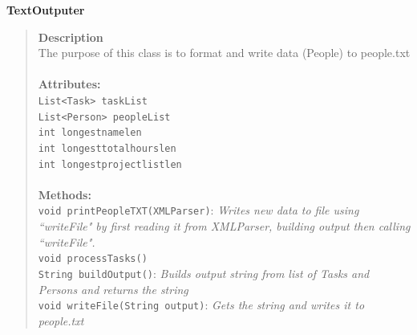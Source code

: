 \documentclass[12pt]{article}
\begin{document}
{\bf TextOutputer}
\begin{quote}
{\bf Description}\\
The purpose of this class is to format and write data (People) to people.txt\\\\
{\bf Attributes:}\\
\texttt{List<Task> taskList}\\
\texttt{List<Person> peopleList}\\
\texttt{int longestnamelen}\\
\texttt{int longesttotalhourslen}\\
\texttt{int longestprojectlistlen }\\\\
{\bf Methods:}\\
\texttt{void printPeopleTXT(XMLParser)}: \emph{Writes new data to file using ``writeFile" by first reading it from XMLParser, building output then calling ``writeFile".}\\
\texttt{void processTasks() }\\
\texttt{String buildOutput()}: \emph{Builds output string from list of Tasks and Persons and returns the string} \\
\texttt{void writeFile(String output)}: \emph{Gets the string and writes it to people.txt}
\end{quote} 
\end{document}
